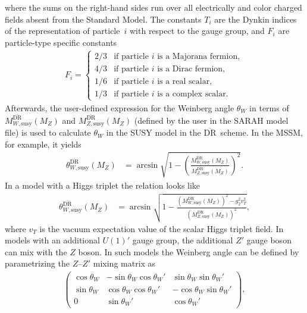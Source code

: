 \documentclass[final,3p,11pt,pdflatex]{elsarticle}
\newcommand{\textoverline}[1]{$\overline{\mbox{#1}}$}
\newcommand{\DRbar}{\textoverline{DR}\xspace}
\begin{document}
%
where the sums on the right-hand sides run over all electrically and
color charged fields absent from the Standard Model.  The constants
$T_i$ are the Dynkin indices of the representation of particle~$i$
with respect to the gauge group, and $F_i$ are particle-type specific
constants \cite{Hall:1980kf}
%
\begin{align}
  F_i =
  \begin{cases}
    2/3 & \text{if particle $i$ is a Majorana fermion},\\
    4/3 & \text{if particle $i$ is a Dirac fermion},\\
    1/6 & \text{if particle $i$ is a real scalar},\\
    1/3 & \text{if particle $i$ is a complex scalar}.
  \end{cases}
\end{align}
%
Afterwards, the user-defined expression for the Weinberg angle
$\theta_W$ in terms of $M_{W,\text{susy}}^{\text{\DRbar}}(M_Z)$ and
$M_{Z,\text{susy}}^{\text{\DRbar}}(M_Z)$ (defined by the user in the
SARAH model file) is used to calculate $\theta_W$ in the SUSY model in
the \DRbar\ scheme.  In the MSSM, for example, it yields
%
\begin{align}
  \theta_{W,\text{susy}}^{\text{\DRbar}}(M_Z) &= \arcsin\sqrt{1
    -
    \left(\frac{M_{W,\text{susy}}^{\text{\DRbar}}(M_Z)}{M_{Z,\text{susy}}^{\text{\DRbar}}(M_Z)}\right)^2}
  .
\end{align}
%
In a model with a Higgs triplet the relation looks like
%
\begin{align}
  \theta_{W,\text{susy}}^{\text{\DRbar}}(M_Z) &= \arcsin\sqrt{1 -
    \frac{\left(M_{W,\text{susy}}^{\text{\DRbar}}(M_Z)\right)^2 -
      g_2^2v_T^2}{\left(M_{Z,\text{susy}}^{\text{\DRbar}}(M_Z)\right)^2}},
\end{align}
%
where $v_T$ is the vacuum expectation value of the scalar Higgs
triplet field.  In models with an additional $U(1)'$ gauge group, the
additional $Z'$ gauge boson can mix with the $Z$ boson.  In such
models the Weinberg angle can be defined by parametrizing the
$Z$--$Z'$ mixing matrix as
%
\begin{align}
  \begin{pmatrix}
    \cos\theta_W & -\sin\theta_W \cos\theta_W' &  \sin\theta_W \sin\theta_W' \\
    \sin\theta_W &  \cos\theta_W \cos\theta_W' & -\cos\theta_W \sin\theta_W' \\
    0 & \sin\theta_W' & \cos\theta_W'
  \end{pmatrix},
\end{align}
\end{document}
